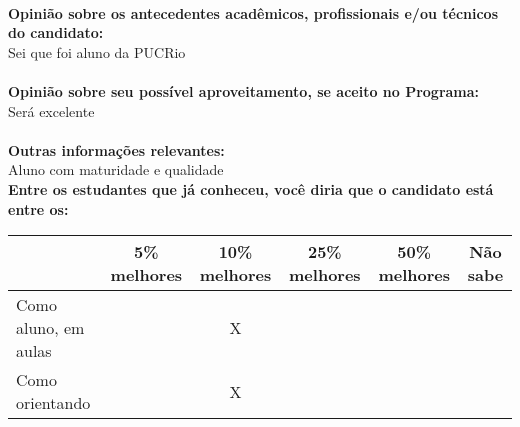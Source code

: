 \documentclass[11pt]{article}
\begin{document}
\\
\textbf{Opinião sobre os antecedentes acadêmicos, profissionais e/ou técnicos do candidato:}
\\Sei que foi aluno da PUCRio\\
\\
\textbf{Opinião sobre seu possível aproveitamento, se aceito no Programa:}
\\Será excelente\\ 
\\
\textbf{Outras informações relevantes:} \\Aluno com maturidade e qualidade
\\[0.3cm]
\textbf{Entre os estudantes que já conheceu, você diria que o candidato está entre os:}
\\
\begin{tabular}{|l|c|c|c|c|c|}
\hline
 & 5\% melhores & 10\% melhores & 25\% melhores & 50\% melhores & Não sabe \\
\hline
Como aluno, em aulas &  & X &  &  & \\
\hline
Como orientando &  & X &  &  & \\
\hline
\end{tabular}
\end{document}
